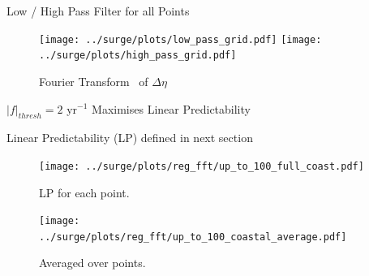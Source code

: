 \begin{frame}{Low / High Pass Filter for all Points}
\vspace{-30pt}
\hspace{-30pt}
 \begin{minipage}{1.15\textwidth}
\begin{figure}[htb!]
    \centering
   \hspace{-40pt} \texttt{[image: ../surge/plots/low\_pass\_grid.pdf]}
        \texttt{[image: ../surge/plots/high\_pass\_grid.pdf]}
    \vspace{-7pt}
    \caption{Fourier Transform~\cite{cooley1965algorithm} of $\Delta\eta$}
    \label{fig:A}
\end{figure}
\end{minipage}
\end{frame}


\begin{frame}{$|f|_{thresh}=2$ yr$^{-1}$ Maximises Linear Predictability }
\centering

Linear Predictability (LP) defined in next section

    \hspace{-30pt}\begin{minipage}{0.57\textwidth}
    \begin{figure}
            \texttt{[image: ../surge/plots/reg\_fft/up\_to\_100\_full\_coast.pdf]}
                \caption{LP for each point.}
    \end{figure}

    \end{minipage}\hspace{5pt}
      \begin{minipage}{0.45\textwidth}
\begin{figure}[htb!]
    \centering
    \texttt{[image: ../surge/plots/reg\_fft/up\_to\_100\_coastal\_average.pdf]}
    \caption{Averaged over points.}
    \label{fig:}
\end{figure}
    \end{minipage}
\end{frame}
